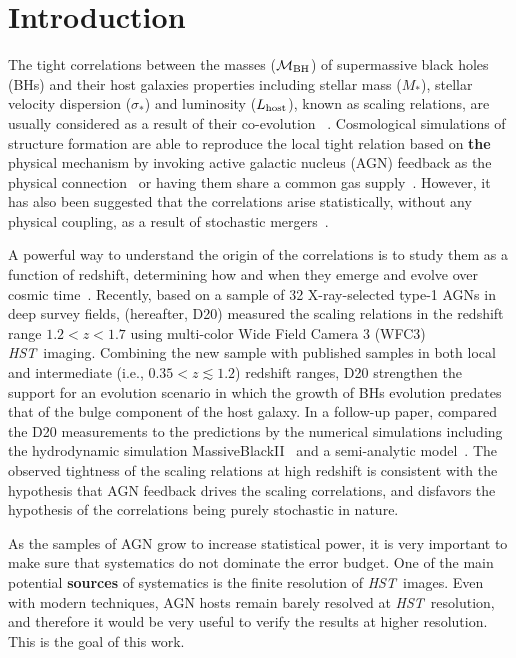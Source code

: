 \documentclass[fleqn,usenatbib]{mnras}
\newcommand{\hst}{{\it HST}}
\newcommand{\mbh}{$\mathcal M_{\rm BH}$}
\newcommand{\lhost}{$L_{\rm host}$}
\newcommand{\mstar}{{$M_*$}}
\begin{document}
\section{Introduction}
The tight correlations between the masses (\mbh) of supermassive black holes (BHs) and their host galaxies properties including stellar mass (\mstar), stellar velocity dispersion ($\sigma_*$) and luminosity (\lhost), known as scaling relations, are usually considered as a result of their co-evolution ~\citep[e.g.,][]{Mag++98, F+M00, Geb++01b, M+H03, Gul++09,Beifi2012, H+R04, Gra++2011}. Cosmological simulations of structure formation are able to reproduce the local tight relation based on {\bf the} physical mechanism by invoking active galactic nucleus (AGN) feedback as the physical connection~\citep{Springel2005, Hopkins2008, Matteo2008, DeG++15} or having them share a common gas supply~\citep{Cen2015, Menci2016}. However, it has also been suggested that the correlations arise statistically, without any physical coupling, as a result of stochastic mergers~\citep{Peng2007, Jahnke2011, Hirschmann2010}. 

A powerful way to understand the origin of the correlations is to study them as a function of redshift, determining how and when they emerge and evolve over cosmic time~\citep[e.g.,][]{TMB04,Sal++06,Woo++06, Jah++09,SS13,Sun2015, Park15}. Recently, based on a sample of 32 X-ray-selected type-1 AGNs in deep survey fields, \citet{Ding2020a} (hereafter, D20) measured the scaling relations in the redshift range $1.2<z<1.7$ using multi-color Wide Field Camera 3 (WFC3) \hst\ imaging. Combining the new sample with published samples in both local and intermediate (i.e., $0.35<z\lesssim1.2$) redshift ranges, D20 strengthen the support for an evolution scenario in which the growth of BHs evolution predates that of  the bulge component of the host galaxy. In a follow-up paper, \citet{Ding2020b} compared the D20 measurements to the predictions by the numerical simulations including the hydrodynamic simulation MassiveBlackII~\citep{Khandai2015} and a semi-analytic model~\citep{Menci2014}. The observed tightness of the  scaling relations at high redshift is consistent with the hypothesis that AGN feedback drives the scaling correlations, and disfavors the hypothesis of the correlations being purely stochastic in nature. 

As the samples of AGN grow to increase statistical power, it is very important to make sure that systematics do not dominate the error budget. One of the main potential {\bf sources} of systematics is the finite resolution of \hst\ images. Even with modern techniques, AGN hosts remain barely resolved at \hst\ resolution, and therefore it would be very useful to verify the results at higher resolution. This is the goal of this work.
\end{document}
